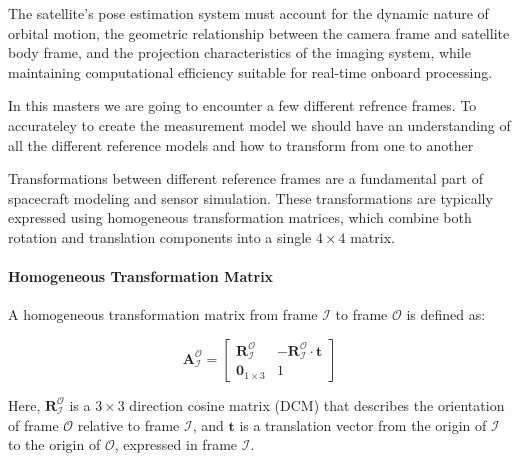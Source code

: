The satellite's pose estimation system must account for the dynamic nature of orbital motion, 
the geometric relationship between the camera frame and satellite body frame, and the projection 
characteristics of the imaging system, while maintaining computational efficiency suitable for 
real-time onboard processing. 



In this masters we are going to encounter a few different refrence frames. To accurateley to create the measurement model we should have an understanding of all the different 
reference models and how to transform from one to another



Transformations between different reference frames are a fundamental part of spacecraft modeling and sensor simulation. These 
transformations are typically expressed using homogeneous transformation matrices, which combine both rotation and translation components 
into a single $4 \times 4$ matrix.

\paragraph{Homogeneous Transformation Matrix}

A homogeneous transformation matrix from frame $\mathcal{I}$ to frame $\mathcal{O}$ is defined as:

\begin{equation}
    \mathbf{A}_\mathcal{I}^\mathcal{O} =
    \begin{bmatrix}
        \mathbf{R}_\mathcal{I}^\mathcal{O} & -\mathbf{R}_\mathcal{I}^\mathcal{O} \cdot \mathbf{t} \\
        \mathbf{0}_{1 \times 3} & 1
    \end{bmatrix}
\end{equation}

Here, $\mathbf{R}_\mathcal{I}^\mathcal{O}$ is a $3 \times 3$ direction cosine matrix (DCM) that describes the orientation of frame $\mathcal{O}$ 
relative to frame $\mathcal{I}$, and $\mathbf{t}$ is a translation vector from the origin of $\mathcal{I}$ to the origin of $\mathcal{O}$, expressed 
in frame $\mathcal{I}$.

